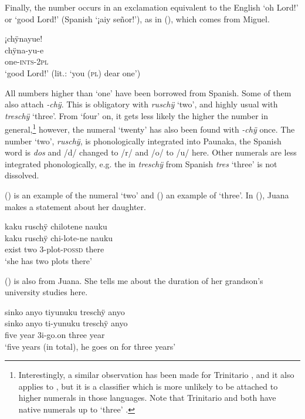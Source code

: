 Finally, the number occurs in an exclamation equivalent to the English ‘oh Lord!’ or ‘good Lord!’ (Spanish ‘¡aiy señor!’), as in (), which comes from Miguel. 

\ea\label{ex:one-7}
\begingl
\glpreamble ¡chÿnayue!\\
\gla chÿna-yu-e\\
\glb one-\textsc{ints}-2\textsc{pl}\\
\glft ‘good Lord!’ (lit.: ‘you (\textsc{pl}) dear one’)
\endgl
\trailingcitation{[rmx-e150922l.060]}%
\xe

All numbers higher than ‘one’ have been borrowed from Spanish. Some of them also attach \textit{-chÿ}. This is obligatory with \textit{ruschÿ} ‘two’, and highly usual with \textit{treschÿ} ‘three’. From ‘four’ on, it gets less likely the higher the number in general,\footnote{Interestingly, a similar observation has been made for Trinitario \citep[23]{Rose2020}, and it also applies to , but it is a classifier which is more unlikely to be attached to higher numerals in those languages. Note that Trinitario and  both have native numerals up to ‘three’ .} however, the numeral ‘twenty’ has also been found with \textit{-chÿ} once. The number ‘two’, \textit{ruschÿ}, is phonologically integrated into Paunaka, the Spanish word is \textit{dos} and /d/ changed to /r/ and /o/ to /u/ here. Other numerals are less integrated phonologically, e.g. the  in \textit{treschÿ} from Spanish \textit{tres} ‘three’ is not dissolved. 

() is an example of the numeral ‘two’ and () an example of ‘three’. In (), Juana makes a statement about her daughter.

\ea\label{ex:two-2}
\begingl
\glpreamble kaku ruschÿ chilotene nauku\\
\gla kaku ruschÿ chi-lote-ne nauku\\
\glb exist two 3-plot-\textsc{possd} there\\
\glft ‘she has two plots there’
\endgl
\trailingcitation{[jxx-p110923l-1.421]}
\xe

() is also from Juana. She tells me about the duration of her grandson’s university studies here.

\ea\label{ex:three-1}
\begingl
\glpreamble sinko anyo tiyunuku treschÿ anyo\\
\gla sinko anyo ti-yunuku treschÿ anyo\\
\glb five year 3i-go.on three year\\
\glft ‘five years (in total), he goes on for three years’
\endgl
\trailingcitation{[jxx-p110923l-1.191]}
\xe


